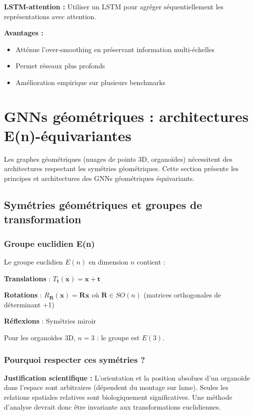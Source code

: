 \textbf{LSTM-attention :}
Utiliser un LSTM pour agréger séquentiellement les représentations avec attention.

\textbf{Avantages :}
\begin{itemize}
    \item Atténue l'over-smoothing en préservant information multi-échelles
    \item Permet réseaux plus profonds
    \item Amélioration empirique sur plusieurs benchmarks
\end{itemize}

\section{GNNs géométriques : architectures E(n)-équivariantes}

Les graphes géométriques (nuages de points 3D, organoïdes) nécessitent des architectures respectant les symétries géométriques. Cette section présente les principes et architectures des GNNs géométriques équivariants.

\subsection{Symétries géométriques et groupes de transformation}

\subsubsection{Groupe euclidien E(n)}

Le groupe euclidien $E(n)$ en dimension $n$ contient :

\textbf{Translations} : $T_{\mathbf{t}}(\mathbf{x}) = \mathbf{x} + \mathbf{t}$

\textbf{Rotations} : $R_{\mathbf{R}}(\mathbf{x}) = \mathbf{R}\mathbf{x}$ où $\mathbf{R} \in SO(n)$ (matrices orthogonales de déterminant +1)

\textbf{Réflexions} : Symétries miroir

Pour les organoïdes 3D, $n = 3$ : le groupe est $E(3)$.

\subsubsection{Pourquoi respecter ces symétries ?}

\textbf{Justification scientifique :}
L'orientation et la position absolues d'un organoïde dans l'espace sont arbitraires (dépendent du montage sur lame). Seules les relations spatiales relatives sont biologiquement significatives. Une méthode d'analyse devrait donc être invariante aux transformations euclidiennes.

